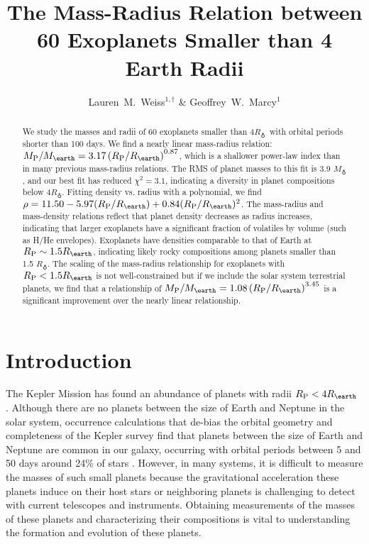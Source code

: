 \documentclass[iop]{emulateapj}
\newcommand{\rpl}{\ensuremath{R_{\rm P}}}
\newcommand{\mpl}{\ensuremath{M_{\rm P}}}
\newcommand{\rearth}{\ensuremath{R_\earth}}
\newcommand{\mearth}{\ensuremath{M_\earth}}
\begin{document}
\title{The Mass-Radius Relation between 60 Exoplanets Smaller than 4 Earth Radii}
\author{Lauren~M.~Weiss$^{1,\dagger}$ \& Geoffrey~W.~Marcy$^1$}


\begin{abstract}
We study the masses and radii of 60 exoplanets smaller than 4\rearth\ with orbital periods shorter than 100 days.  We find a nearly linear mass-radius relation: $\mpl/\mearth = 3.17 \left(\rpl/\rearth\right)^{0.87}$, which is a shallower power-law index than in many previous mass-radius relations.  The RMS of planet masses to this fit is 3.9 \mearth, and our best fit has reduced $\chi^2=3.1$, indicating a diversity in planet compositions below 4\rearth.  Fitting density vs. radius with a polynomial, we find $\rho = 11.50 -5.97(\rpl/\rearth) + 0.84(\rpl/\rearth)^2$.  The mass-radius and mass-density relations reflect that planet density decreases as radius increases, indicating that larger exoplanets have a significant fraction of volatiles by volume (such as H/He envelopes).  Exoplanets have densities comparable to that of Earth at  $\rpl \sim1.5\rearth$, indicating likely rocky compositions among planets smaller than 1.5 \rearth. The scaling of the mass-radius relationship for exoplanets with $\rpl < 1.5 \rearth$ is not well-constrained but if we include the solar system terrestrial planets, we find that a relationship of $\mpl/\mearth = 1.08 \left(\rpl/\rearth\right)^{3.45}$ is a significant improvement over the nearly linear relationship.
\end{abstract}


\section{Introduction}

The Kepler Mission has found an abundance of planets with radii $\rpl < 4\rearth$ \citep{Batalha2013}.  Although there are no planets between the size of Earth and Neptune in the solar system, occurrence calculations that de-bias the orbital geometry and completeness of the Kepler survey find that planets between the size of Earth and Neptune are common in our galaxy, occurring with orbital periods between 5 and 50 days around 24\% of stars \citep{Petigura2013a}.  However, in many systems, it is difficult to measure the masses of such small planets because the gravitational acceleration these planets induce on their host stars or neighboring planets is challenging to detect with current telescopes and instruments.  Obtaining measurements of the masses of these planets and characterizing their compositions is vital to understanding the formation and evolution of these planets.
\end{document}
